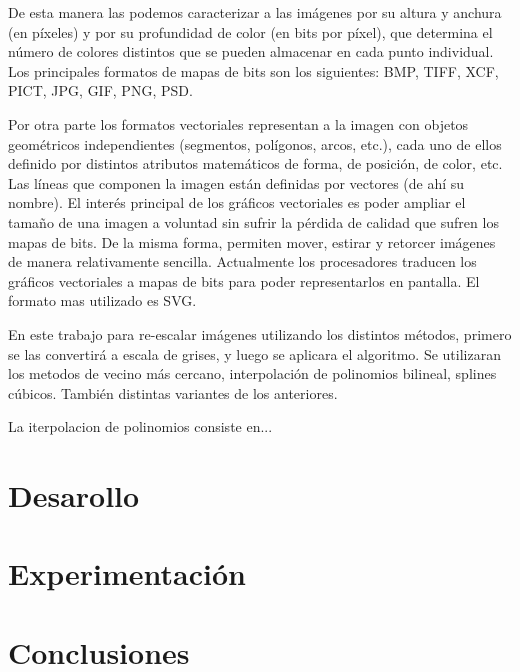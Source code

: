 \documentclass[a4paper]{article}
\begin{document}
De esta manera las podemos caracterizar a las imágenes por su altura y anchura (en píxeles) y por su profundidad de color (en bits por píxel), que determina el número de colores distintos que se pueden almacenar en cada punto individual. Los principales formatos de mapas de bits son los siguientes: BMP, TIFF, XCF, PICT, JPG, GIF, PNG, PSD.

Por otra parte los formatos vectoriales representan a la imagen con objetos geométricos independientes (segmentos, polígonos, arcos, etc.), cada uno de ellos definido por distintos atributos matemáticos de forma, de posición, de color, etc. Las líneas que componen la imagen están definidas por vectores (de ahí su nombre). El interés principal de los gráficos vectoriales es poder ampliar el tamaño de una imagen a voluntad sin sufrir la pérdida de calidad que sufren los mapas de bits. De la misma forma, permiten mover, estirar y retorcer imágenes de manera relativamente sencilla. Actualmente los procesadores traducen los gráficos vectoriales a mapas de bits para poder representarlos en pantalla. El formato mas utilizado es SVG.

En este trabajo para re-escalar imágenes utilizando los distintos métodos, primero se las convertirá a escala de grises, y luego se aplicara el algoritmo. Se utilizaran los metodos de vecino más cercano, interpolación de polinomios bilineal, splines cúbicos. También distintas variantes de los anteriores.

La iterpolacion de polinomios consiste en... 


\newpage 

\section{Desarollo}



\section{Experimentación}








\section{Conclusiones}
\end{document}
